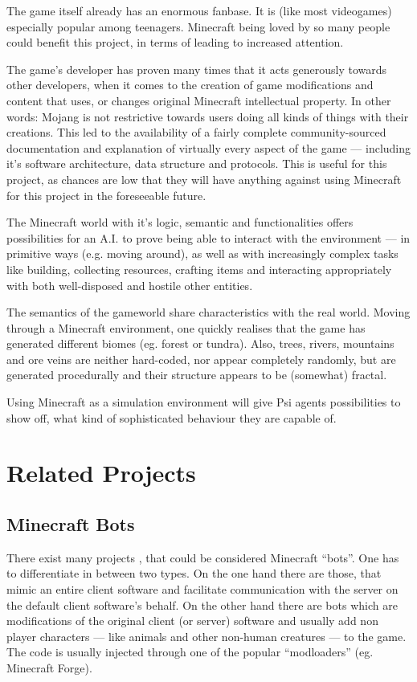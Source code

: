 The game itself already has an enormous fanbase. It is (like most videogames) especially popular among teenagers. Minecraft being loved by so many people could benefit this project, in terms of leading to increased attention.

The game's developer has proven many times that it acts generously towards  other developers, when it comes to the creation of game modifications and content that uses, or changes original Minecraft intellectual property. In other words: Mojang is not restrictive towards users doing all kinds of things with their creations. This led to the availability of a fairly complete community-sourced  documentation and explanation of virtually every aspect of the game --- including it's software architecture, data structure and protocols. This is useful for this project, as chances are low that they will have anything against using Minecraft for this project in the foreseeable future. %

The Minecraft world with it's logic, semantic and functionalities offers possibilities for an A.I. to prove being able to interact with the environment --- in primitive ways (e.g. moving around), as well as with increasingly complex tasks like building, collecting resources, crafting items and interacting appropriately with both well-disposed and hostile other entities.

The semantics of the gameworld share characteristics with the real world. Moving through a Minecraft environment, one quickly realises that the game has generated different biomes (eg. forest or tundra). Also, trees, rivers, mountains and ore veins are neither hard-coded, nor appear completely randomly, but are generated procedurally and their structure appears to be (somewhat) fractal.
        
Using Minecraft as a simulation environment will give Psi agents possibilities to show off, what kind of sophisticated behaviour they are capable of.

\section{Related Projects}
    \subsection{Minecraft Bots}
There exist many projects , that could be considered Minecraft ``bots''. One has to differentiate in between two types. On the one hand there are those, that mimic an entire client software and facilitate communication with the server on the default client software's behalf. On the other hand there are bots which are modifications of the original client (or server) software and usually add non player characters --- like animals and other non-human creatures --- to the game. The code is usually injected through one of the popular ``modloaders'' (eg. Minecraft Forge).

